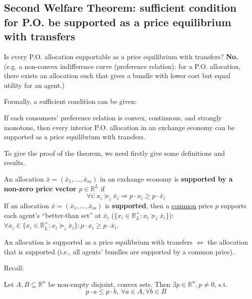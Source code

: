 \documentclass[11pt]{elegantbook}
\begin{document}
\subsection{Second Welfare Theorem: sufficient condition for P.O. be supported as a price equilibrium with transfers}
\begin{remark}
    Is every P.O. allocation supportable as a price equilibrium with transfers? \textbf{No.} (e.g. a non-convex indifference curve (preference relation): for a P.O. allocation, there exists an allocation such that gives a bundle with lower cost but equal utility for an agent.)
\end{remark}
Formally, a sufficient condition can be given:
\begin{theorem}\label{SWT_sup}
    If each consumers' preference relation is convex, continuous, and strongly monotone, then every interior P.O. allocation in an exchange economy can be supported as a price equilibrium with transfers.
\end{theorem}
To give the proof of the theorem, we need firstly give some definitions and results.
\begin{definition}
    \normalfont
    An allocation $\bar{x}=\left(\bar{x}_1,...,\bar{x}_m\right)$ in an exchange economy is \textbf{supported by a non-zero price vector $p\in \mathbb{R}^L$} if $$\forall i: x_i\succeq_i\bar{x}_i \Rightarrow p\cdot x_i\geq p\cdot\bar{x}_i$$
    If an allocation $\bar{x}=\left(\bar{x}_1,...,\bar{x}_m\right)$ is \textbf{supported}, then a \underline{common} price $p$ supports each agent's ``better-than set'' at $\bar{x}_i$ ($\{x_i\in \mathbb{R}_L^+: x_i\succeq_i\bar{x}_i\}$): $\forall x_i\in \{x_i\in \mathbb{R}_L^+: x_i\succeq_i\bar{x}_i\}: p\cdot x_i\geq p\cdot \bar{x}_i$.
\end{definition}
\begin{note}
    An allocation is supported as a price equilibrium with transfers $\Leftrightarrow$ the allocation that is supported (i.e., all agents' bundles are supported by a common price).
\end{note}

Recall:
\begin{theorem}\label{SHT}
    Let $A,B\subseteq \mathbb{R}^n$ be non-empty disjoint, convex sets. Then $\exists p\in \mathbb{R}^n,p\neq 0$, s.t. $$p\cdot a\leq p\cdot b,\ \forall a\in A, \forall b\in B$$
\end{theorem}
\end{document}
